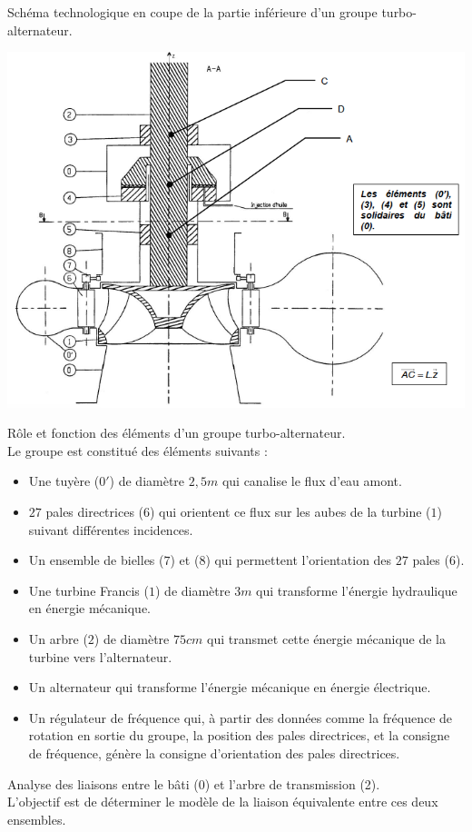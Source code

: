 Sch\'ema technologique en coupe de la partie inf\'erieure d'un groupe turbo-alternateur.

\begin{center}
    \includegraphics[scale=0.5]{png/3_exo4.png}
\end{center}

R\^ole et fonction des \'el\'ements d'un groupe turbo-alternateur.\\
Le groupe est constitu\'e des \'el\'ements suivants :
\begin{itemize}
\item Une tuy\`ere ($0'$) de diam\`etre $2,5m$ qui canalise le flux d'eau amont.
\item $27$ pales directrices ($6$) qui orientent ce flux sur les aubes de la turbine ($1$) suivant diff\'erentes incidences.
\item Un ensemble de bielles ($7$) et ($8$) qui permettent l'orientation des $27$ pales ($6$).
\item Une turbine Francis ($1$) de diam\`etre $3m$ qui transforme l'\'energie hydraulique en \'energie m\'ecanique.
\item Un arbre ($2$) de diam\`etre $75cm$ qui transmet cette \'energie m\'ecanique de la turbine vers l'alternateur.
\item Un alternateur qui transforme l'\'energie m\'ecanique en \'energie \'electrique.
\item Un r\'egulateur de fr\'equence qui, \`a partir des donn\'ees comme la fr\'equence de rotation en sortie du groupe, la position des pales directrices, et la consigne de fr\'equence, g\'en\`ere la consigne d'orientation des pales directrices.
\end{itemize}
Analyse des liaisons entre le b\^ati (0) et l'arbre de transmission (2).\\
L'objectif est de d\'eterminer le mod\`ele de la liaison \'equivalente entre ces deux ensembles.

